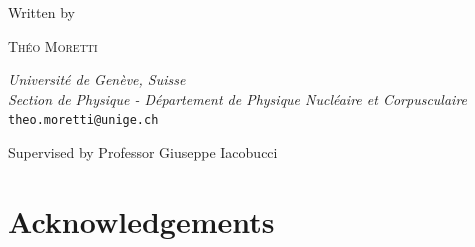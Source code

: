 \documentclass[a4paper, 11pt, twoside]{report}
\begin{document}
\begin{titlepage}
	\vspace*{0.5\baselineskip}
	
	Written by
	
	\vspace{0.5\baselineskip} %
	
	{\scshape\large Théo Moretti} %

	\vspace{2\baselineskip} %
	
	\textit{\large Université de Genève, Suisse \\
			Section de Physique - Département de Physique Nucléaire et Corpusculaire \\}
			\texttt{theo.moretti@unige.ch} \\ %
	
	\vspace{2\baselineskip} %

Supervised by Professor Giuseppe Iacobucci
	
	
	\vspace{0.3\baselineskip} %
	
	

\end{titlepage}

				
\newpage
\tableofcontents
\thispagestyle{empty}
\newpage
\setcounter{page}{1}

\chapter*{Acknowledgements}



\vspace{15mm}


\hspace{120mm}


\clearpage


\clearpage


\clearpage


\clearpage


\clearpage


\clearpage


\clearpage


\clearpage

\printbibliography

\end{document}
